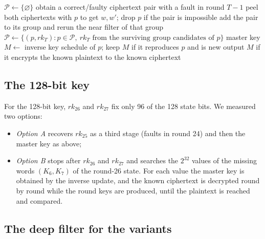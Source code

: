 \documentclass[pdflatex,sn-mathphys-num]{sn-jnl}
\theoremstyle{thmstyleone}%
\theoremstyle{thmstylethree}%
\newcommand{\rk}{\mathit{rk}}
\begin{document}
\begin{algorithm}[t]
\caption{Full key recovery (64/96; 64/128 option A adds a stage for $\rk_{25}$)}\label{alg:chain}
\begin{algorithmic}[1]
\State $\mathcal{P}\gets\{\varnothing\}$ 
  \Repeat
    \State obtain a correct/faulty ciphertext pair with a fault in round $T-1$
      \State peel both ciphertexts with $p$ to get $w,w'$; drop $p$ if the pair is impossible
      \State add the pair to its group and rerun the near filter of that group
    \EndFor
  \State $\mathcal{P}\gets\{(p,\rk_T) : p\in\mathcal{P},\ \rk_T \text{ from the surviving group candidates of } p\}$
\EndFor
{}
  \State master key $M\gets$ inverse key schedule of $p$; keep $M$ if it reproduces $p$ and is new
  \State output $M$ if it encrypts the known plaintext to the known ciphertext
\EndFor
\end{algorithmic}
\end{algorithm}

\subsection{The 128-bit key}

For the 128-bit key, $\rk_{26}$ and $\rk_{27}$ fix only 96 of the 128 state bits. We measured two
options:
\begin{itemize}
\item \emph{Option A} recovers $\rk_{25}$ as a third stage (faults in round 24) and then the master key as
above;
\item \emph{Option B} stops after $\rk_{26}$ and $\rk_{27}$ and searches the $2^{32}$ values of the
missing words $(K_6,K_7)$ of the round-26 state. For each value the master key is obtained by the
inverse update, and the known ciphertext is decrypted round by round while the round keys are produced,
until the plaintext is reached and compared.
\end{itemize}

\subsection{The deep filter for the variants}\label{sec:deep}
\end{document}
